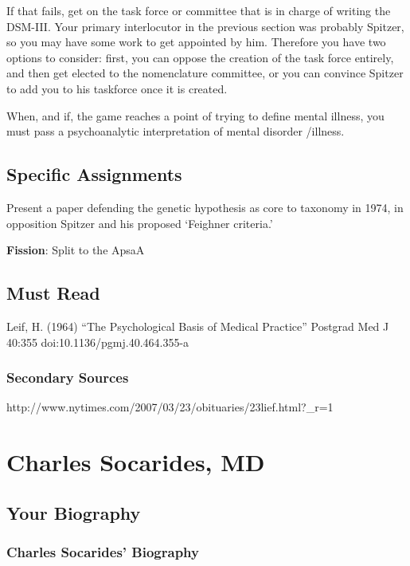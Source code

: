 \begin{refsection}
If that fails, get on the task force or committee that is in charge of writing the DSM-III. Your primary interlocutor in the previous section was probably Spitzer, so you may have some work to get appointed by him. Therefore you have two options to consider: first, you can oppose the creation of the task force entirely, and then get elected to the nomenclature committee, or you can convince Spitzer to add you to his taskforce once it is created.

When, and if, the game reaches a point of trying to define mental illness, you must pass a psychoanalytic interpretation of mental disorder \slash  illness.

\section{Specific Assignments}
\label{specificassignments}

Present a paper defending the genetic hypothesis as core to taxonomy in 1974, in opposition Spitzer and his proposed `Feighner criteria.'

\textbf{Fission}: Split to the ApsaA

\section{Must Read}
\label{mustread}

Leif, H. (1964) ``The Psychological Basis of Medical Practice'' Postgrad Med J 40:355 doi:10.1136\slash pgmj.40.464.355-a

\subsection{Secondary Sources}
\label{secondarysources}

http:\slash \slash www.nytimes.com\slash 2007\slash 03\slash 23\slash obituaries\slash 23lief.html?\_r=1

\chapter{Charles Socarides, MD}
\label{charlessocaridesmd}

\section{Your Biography}
\label{yourbiography}

\subsection{Charles Socarides' Biography}
\label{charlessocaridesbiography}


\end{refsection}
